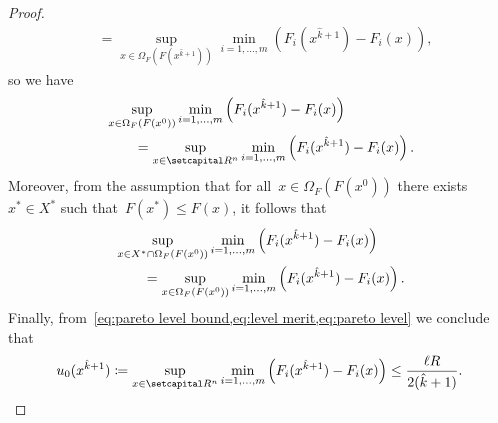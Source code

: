 \documentclass[../../main]{subfiles}
\begin{document}
\begin{proof}
\[\begin{split}
        &= \sup_{x \in \Omega_F(F(x^{\hat{k} + 1}))} \min_{i = 1, \dots, m} \left( F_i(x^{\hat{k} + 1}) - F_i(x) \right)
        ,\end{split}
    \]
    so we have
    \begin{equation} \label{eq:level merit}
        \begin{split}
            \MoveEqLeft \sup_{x \in \Omega_F(F(x^0))} \min_{i = 1, \dots, m} \left( F_i(x^{\hat{k} + 1}) - F_i(x) \right) \\
        &= \sup_{x \in \setR^n} \min_{i = 1, \dots, m} \left( F_i(x^{\hat{k} + 1}) - F_i(x) \right).
        \end{split}
    \end{equation}
    Moreover, from the assumption that for all~$x \in \Omega_F(F(x^0))$ there exists~$x^\ast \in X^\ast$ such that~$F(x^\ast) \le F(x)$, it follows that
    \begin{equation} \label{eq:pareto level}
        \begin{split}
            \MoveEqLeft \sup_{x \in X^\ast \cap \Omega_F(F(x^0))} \min_{i = 1, \dots, m} \left( F_i(x^{\hat{k} + 1}) - F_i(x) \right) \\
            &= \sup_{x \in \Omega_F(F(x^0))} \min_{i = 1, \dots, m} \left( F_i(x^{\hat{k} + 1}) - F_i(x) \right)
        .\end{split}
    \end{equation}
    Finally, from~\cref{eq:pareto level bound,eq:level merit,eq:pareto level} we conclude that
    \[
        u_0(x^{\hat{k} + 1}) \coloneqq \sup_{x \in \setR^n} \min_{i = 1, \dots, m} \left( F_i(x^{\hat{k} + 1}) - F_i(x) \right) \le \frac{\ell R}{2 (\hat{k} + 1)}.
    \]
\end{proof}
\end{document}

